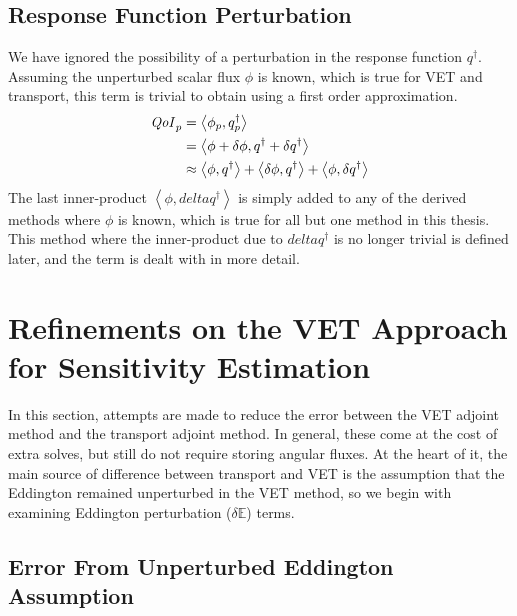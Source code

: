 \documentclass[12pt]{report}
\newcommand{\bra}{\left\langle}
\newcommand{\ket}{\right\rangle}
\newcommand{\Edd}{\mathbb{E}}
\newcommand{\scalResp}{q^\dag}
\newcommand{\qoi}{{\it QoI}\xspace}
\begin{document}
\subsection{Response Function Perturbation}
We have ignored the possibility of a perturbation in the response function $\scalResp$. Assuming the unperturbed scalar flux $\phi$ is known, which is true for VET and transport, this term is trivial to obtain using a first order approximation.
\begin{equation}
\begin{split}
\qoi_p 
&= \bra \phi_p , \scalResp_p \ket \\ 
&= \bra \phi + \delta \phi , \scalResp + \delta \scalResp \ket \\ 
&\approx \bra \phi , \scalResp \ket + \bra \delta \phi , \scalResp \ket + \bra \phi , \delta \scalResp \ket \\ 
\end{split}
\end{equation}
The last inner-product $\bra \phi , delta \scalResp \ket$ is simply added to any of the derived methods where $\phi$ is known, which is true for all but one method in this thesis. This method where the inner-product due to $delta \scalResp$ is no longer trivial is defined later, and the term is dealt with in more detail.

\section{Refinements on the VET Approach for Sensitivity Estimation}

In this section, attempts are made to reduce the error between the VET adjoint method and the transport adjoint method. In general, these come at the cost of extra solves, but still do not require storing angular fluxes. At the heart of it, the main source of difference between transport and VET is the assumption that the Eddington remained unperturbed in the VET method, so we begin with examining Eddington perturbation ($\delta \Edd$) terms. 
\subsection{Error From Unperturbed Eddington Assumption}
\end{document}
